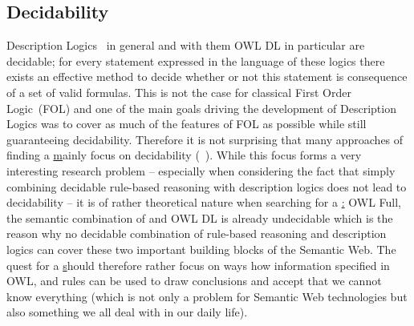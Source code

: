 \subsection{Decidability}
 Description Logics~\cite{dl} in general and with them OWL DL \cite{owldsem} in particular are decidable; for every statement expressed in the language of these logics there
exists an effective method to decide whether or not this statement is consequence of a set of valid formulas. This is not the case for classical 
First Order Logic~(FOL) and one of the main goals driving the development of Description Logics was to cover as much of the features of FOL as possible while still guaranteeing 
decidability. Therefore it is not surprising that many approaches of finding a \ul mainly focus on decidability (\eg~\cite{unilogic,dllog}). 
While this focus forms a very interesting research problem -- especially when considering the fact that simply combining decidable rule-based reasoning with description logics 
does not lead to decidability \cite{orl} -- it is of rather theoretical nature when searching for a \ul: OWL Full, 
the semantic combination of \rdf and OWL DL is already undecidable which is the reason why no decidable combination of rule-based reasoning and description logics can cover these 
two important building blocks of the Semantic Web.
%
% 
The quest for a \ul should therefore rather focus on ways how information specified in OWL, \rdf and rules can be used to draw conclusions
and accept that we cannot know everything (which is not only a problem  for Semantic Web technologies but also something we all deal with in our daily life). 







